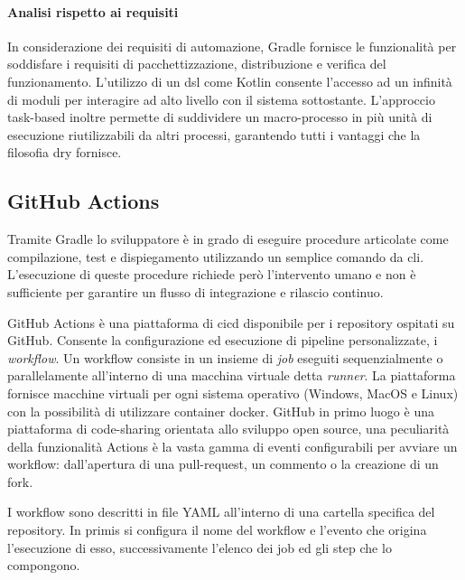 \paragraph{Analisi rispetto ai requisiti}
In considerazione dei requisiti di automazione, Gradle fornisce le funzionalità per soddisfare i requisiti di pacchettizzazione, distribuzione e verifica del funzionamento. L'utilizzo di un \ac{dsl} come Kotlin consente l'accesso ad un infinità di moduli per interagire ad alto livello con il sistema sottostante. L'approccio task-based inoltre permette di suddividere un macro-processo in più unità di esecuzione riutilizzabili da altri processi, garantendo tutti i vantaggi che la filosofia \ac{dry} fornisce.

\newpage
\subsection{GitHub Actions}

Tramite Gradle lo sviluppatore è in grado di eseguire procedure articolate come compilazione, test e dispiegamento utilizzando un semplice comando da \ac{cli}. \\ L'esecuzione di queste procedure richiede però l'intervento umano e non è sufficiente per garantire un flusso di integrazione e rilascio continuo. 

GitHub Actions è una piattaforma di \ac{cicd} disponibile per i repository ospitati su GitHub. Consente la configurazione ed esecuzione di pipeline personalizzate, i \textit{workflow}. Un workflow consiste in un insieme di \textit{job} eseguiti sequenzialmente o parallelamente all'interno di una macchina virtuale detta \textit{runner}. La piattaforma fornisce macchine virtuali per ogni sistema operativo (Windows, MacOS e Linux) con la possibilità di utilizzare container docker. GitHub in primo luogo è una piattaforma di code-sharing orientata allo sviluppo open source, una peculiarità della funzionalità Actions è la vasta gamma di eventi configurabili per avviare un workflow: dall'apertura di una pull-request, un commento o la creazione di un fork.

I workflow sono descritti in file YAML all'interno di una cartella specifica del repository. In primis si configura il nome del workflow e l'evento che origina l'esecuzione di esso, successivamente l'elenco dei job ed gli step che lo compongono. 

